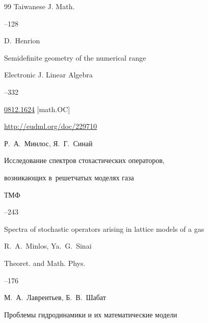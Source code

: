 \begin{thebibliography}{99}
\jour Taiwanese J. Math. 




--128




\by D.~Henrion 

\paper Semidefinite geometry of the numerical range 

\jour Electronic J. Linear Algebra 



--332

\arxiv \href{http://arxiv.org/abs/0812.1624}{0812.1624} [math.OC]

\elink \url{http://eudml.org/doc/229710}




\by Р.~А.~Минлос, Я.~Г.~Синай

\paper Исследование спектров стохастических операторов,

возникающих в~решетчатых моделях газа

\jour ТМФ




--243



\transl

\paper Spectra of stochastic operators arising in lattice models of a gas

\by R.~A.~Minlos, Ya.~G.~Sinai 

\jour Theoret. and Math. Phys.




--176





\by М.~А.~Лаврентьев, Б.~В.~Шабат

\book Проблемы гидродинамики и их математические модели 


\end{thebibliography}
